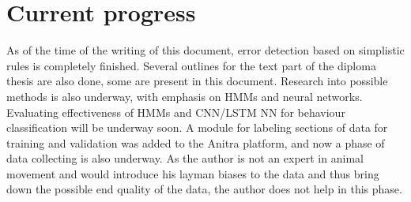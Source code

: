 \chapter{Current progress}

As of the time of the writing of this document, error detection based on simplistic rules is completely finished. Several outlines for the text part of the diploma thesis are also done, some are present in this document. Research into possible methods is also underway, with emphasis on HMMs and neural networks. Evaluating effectiveness of HMMs and CNN/LSTM NN for behaviour classification will be underway soon. A module for labeling sections of data for training and validation was added to the Anitra platform, and now a phase of data collecting is also underway. As the author is not an expert in animal movement and would introduce his layman biases to the data and thus bring down the possible end quality of the data, the author does not help in this phase.